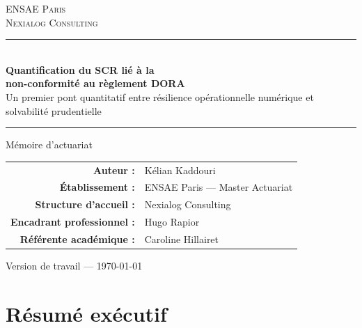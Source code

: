 \documentclass[11pt,a4paper]{article}
\theoremstyle{navystyle}
\theoremstyle{navydef}
\begin{document}
\begin{titlepage}
\pagestyle{empty}
\begin{center}

\vspace*{1cm}
{\small\color{navy}\textsc{ENSAE Paris}}\\
{\small\color{navy}\textsc{Nexialog Consulting}}

\vspace{2cm}
\noindent\rule{\textwidth}{0.8pt}\\[0.5cm]

{\LARGE\color{navy}\bfseries Quantification du SCR lié à la\\[4pt] non-conformité au règlement DORA}\\[10pt]
{\large\color{bluemid} Un premier pont quantitatif entre résilience opérationnelle numérique et solvabilité prudentielle}

\vspace{0.5cm}
\noindent\rule{\textwidth}{0.8pt}

\vspace{2.5cm}
{\large Mémoire d'actuariat}

\vspace{2cm}

\begin{tabular}{rl}
\textbf{Auteur :} & Kélian Kaddouri \\[4pt]
\textbf{Établissement :} & ENSAE Paris --- Master Actuariat \\[4pt]
\textbf{Structure d'accueil :} & Nexialog Consulting \\[4pt]
\textbf{Encadrant professionnel :} & Hugo Rapior \\[4pt]
\textbf{Référente académique :} & Caroline Hillairet \\
\end{tabular}

\vfill

{\small\color{navy} Version de travail --- \today}

\end{center}
\end{titlepage}

\clearpage
\thispagestyle{fancy}

\section*{\color{navy}Résumé exécutif}
\end{document}
